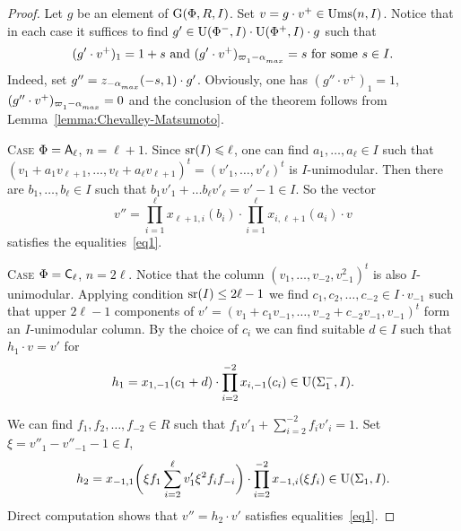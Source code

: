 \begin{proof}

Let $g$ be an element of $\operatorname{G}(\Phi, R, I)$. Set $v=g \cdot v^+\in\operatorname{Ums}(n, I)$. 
Notice that in each case it suffices to find $g' \in \operatorname{U}(\Phi^-, I) \cdot \operatorname{U}(\Phi^+, I) \cdot g$ such that 
\begin{equation} \label{eq1} (g'\cdot v^+)_{1} = 1 + s \text{ and } (g'\cdot v^+)_{\varpi\ssub{1}-\alpha\ssub{max}} = s\ \text{for some}\ s\in I. \end{equation}
Indeed, set $g'' = z_{-\alpha\ssub{max}}(-s, 1) \cdot g'$.
Obviously, one has $(g''\cdot v^+)_1 = 1$, $(g''\cdot v^+)_{\varpi\ssub{1}-\alpha\ssub{max}}=0$ and the conclusion of the theorem follows from Lemma~\ref{lemma:Chevalley-Matsumoto}.

\textsc{Case $\Phi=\mathsf{A}_\ell$, $n=\ell + 1$.}
Since $\operatorname{sr}(I)\leqslant\ell$, one can find $a_1,\ldots,a_\ell\in I$ such that $(v_1+a_1v_{\ell+1},\ldots,v_\ell+a_\ell v_{\ell+1})^t=(v'_1,\ldots,v'_\ell)^t$ is $I$-unimodular. Then there are $b_1,\ldots,b_\ell\in I$ such that $b_1v'_1+\ldots b_\ell v'_\ell=v'-1\in I$. So the vector
\[ v'' = \prod_{i=1}^\ell x_{\ell+1,i}(b_i) \cdot \prod_{i=1}^\ell x_{i,\ell+1}(a_i) \cdot v \]
satisfies the equalities~\ref{eq1}.

\textsc{Case $\Phi=\mathsf{C}_\ell$, $n=2\ell$.}
Notice that the column $(v_1,\ldots, v_{-2}, v_{-1}^2)^t$ is also $I$-unimodular.
Applying condition $\operatorname{sr}(I)\leq 2\ell-1$ we find $c_1, c_2, \ldots, c_{-2} \in I \cdot v_{-1}$ such that upper $2\ell -1$ components of $v'=(v_1 + c_1 v_{-1}, \ldots, v_{-2} + c_{-2}v_{-1}, v_{-1})^t$ form an $I$-unimodular column.
By the choice of $c_i$ we can find suitable $d\in I$ such that $h_1 \cdot v = v'$ for
\[ h_1 = x_{1,-1}(c_1 + d) \cdot \prod_{i=2}^{-2} x_{i,-1}(c_i) \in \operatorname{U}(\Sigma_1^-, I). \]

We can find $f_1, f_2,\ldots, f_{-2} \in R$ such that $f_1v'_1+\sum_{i=2}^{-2} f_i v'_i = 1$.
Set $\xi = v''_1-v''_{-1}-1 \in I$,
\[ h_2 = x_{-1,1}\biggl(\xi f_1 \sum_{i=2}^\ell v_1' \xi^2 f_i f_{-i}\biggr) \cdot \prod_{i=2}^{-2} x_{-1,i}(\xi f_i) \in \operatorname{U}(\Sigma_1, I). \]
Direct computation shows that $v'' = h_2 \cdot v'$ satisfies equalities~\ref{eq1}.



\end{proof}
